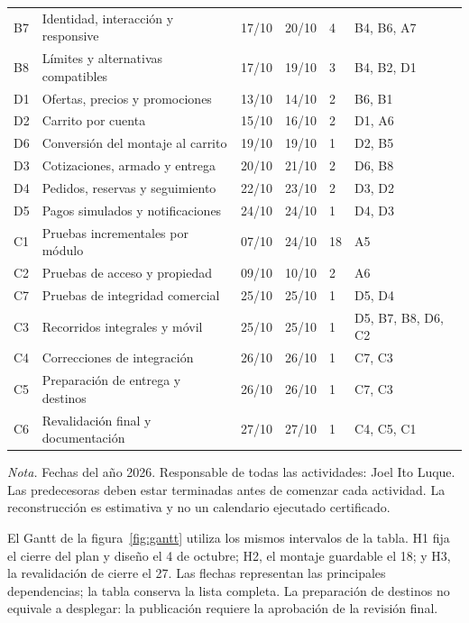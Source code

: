 \documentclass[12pt,letterpaper]{article}
\newcommand{\nota}[1]{\par{\normalfont\normalsize\doublespacing\raggedright\setlength{\parindent}{0pt}\noindent\textit{Nota.} #1\par}}
\newenvironment{tabla}{\par\begingroup\normalsize\singlespacing\setlength{\tabcolsep}{5pt}\renewcommand{\arraystretch}{1.25}}{\par\endgroup}
\begin{document}
\begin{tabla}
\begin{longtable}{L{.65cm}L{5.2cm}L{1.45cm}L{1.45cm}L{.8cm}L{1.9cm}}
B7 & Identidad, interacción y responsive & 17/10 & 20/10 & 4 & B4, B6, A7\\
B8 & Límites y alternativas compatibles & 17/10 & 19/10 & 3 & B4, B2, D1\\
D1 & Ofertas, precios y promociones & 13/10 & 14/10 & 2 & B6, B1\\
D2 & Carrito por cuenta & 15/10 & 16/10 & 2 & D1, A6\\
D6 & Conversión del montaje al carrito & 19/10 & 19/10 & 1 & D2, B5\\
D3 & Cotizaciones, armado y entrega & 20/10 & 21/10 & 2 & D6, B8\\
D4 & Pedidos, reservas y seguimiento & 22/10 & 23/10 & 2 & D3, D2\\
D5 & Pagos simulados y notificaciones & 24/10 & 24/10 & 1 & D4, D3\\
C1 & Pruebas incrementales por módulo & 07/10 & 24/10 & 18 & A5\\
C2 & Pruebas de acceso y propiedad & 09/10 & 10/10 & 2 & A6\\
C7 & Pruebas de integridad comercial & 25/10 & 25/10 & 1 & D5, D4\\
C3 & Recorridos integrales y móvil & 25/10 & 25/10 & 1 & D5, B7, B8, D6, C2\\
C4 & Correcciones de integración & 26/10 & 26/10 & 1 & C7, C3\\
C5 & Preparación de entrega y destinos & 26/10 & 26/10 & 1 & C7, C3\\
C6 & Revalidación final y documentación & 27/10 & 27/10 & 1 & C4, C5, C1\\\bottomrule
\end{longtable}\end{tabla}
\nota{Fechas del año 2026. Responsable de todas las actividades: Joel Ito Luque. Las predecesoras deben estar terminadas antes de comenzar cada actividad. La reconstrucción es estimativa y no un calendario ejecutado certificado.}

El Gantt de la figura~\ref{fig:gantt} utiliza los mismos intervalos de la tabla. H1 fija el cierre del plan y diseño el 4 de octubre; H2, el montaje guardable el 18; y H3, la revalidación de cierre el 27. Las flechas representan las principales dependencias; la tabla conserva la lista completa. La preparación de destinos no equivale a desplegar: la publicación requiere la aprobación de la revisión final.
\end{document}
